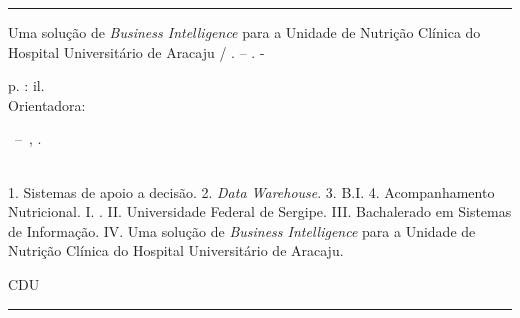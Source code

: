 \begin{fichacatalografica}
	\sffamily
\vspace*{15cm} %
\hrule %
  \begin{center} %
      \begin{minipage}[c]{12.5cm} %
      	
        \imprimirautor
        
        \hspace{0.5cm} Uma  solução  de \textit{Business Intelligence} para a Unidade de Nutrição Clínica do Hospital Universitário de Aracaju / \imprimirautor. -- \imprimirlocal. \imprimirdata -
        
        \hspace{0.5cm} \pageref{LastPage} p. : il.\\
        
        \hspace{0.5cm} Orientadora: \imprimirorientador\\
        
        \hspace{0.5cm}
        \parbox[t]{\textwidth}{\imprimirtipotrabalho~--~\imprimirinstituicao, \imprimirdata.}\\
        
        \hspace{0.5cm}
        1. Sistemas de apoio a decisão.
        2. \textit{Data Warehouse}.
        3. B.I.
        4. Acompanhamento Nutricional.
        I. \imprimirorientador.
        II. Universidade Federal de Sergipe.
        III. Bachalerado em Sistemas de Informação.
        IV. Uma  solução  de \textit{Business Intelligence} para a Unidade de Nutrição Clínica do Hospital Universitário de Aracaju.
        
        \hspace{8.75cm} CDU\\
        
      \end{minipage}
  \end{center}
  \hrule
	
\end{fichacatalografica}